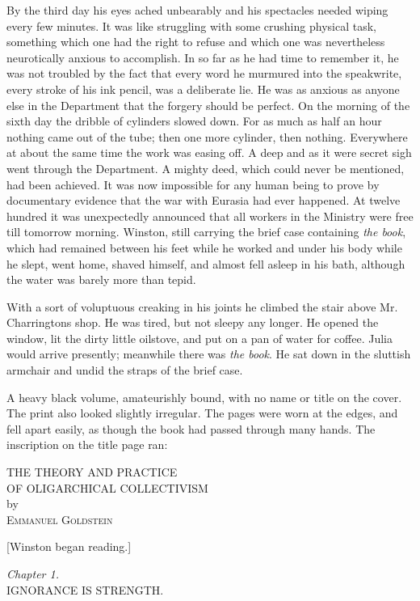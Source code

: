 By the third day his eyes ached unbearably and his spectacles needed
wiping every few minutes. It was like struggling with some crushing
physical task, something which one had the right to refuse and which one
was nevertheless neurotically anxious to accomplish. In so far as he had
time to remember it, he was not troubled by the fact that every word he
murmured into the speakwrite, every stroke of his ink pencil, was a
deliberate lie. He was as anxious as anyone else in the Department that
the forgery should be perfect. On the morning of the sixth day the
dribble of cylinders slowed down. For as much as half an hour nothing
came out of the tube; then one more cylinder, then nothing. Everywhere
at about the same time the work was easing off. A deep and as it were
secret sigh went through the Department. A mighty deed, which could
never be mentioned, had been achieved. It was now impossible for any
human being to prove by documentary evidence that the war with Eurasia
had ever happened. At twelve hundred it was unexpectedly announced that
all workers in the Ministry were free till tomorrow morning. Winston,
still carrying the brief case containing \emph{the book}, which had
remained between his feet while he worked and under his body while he
slept, went home, shaved himself, and almost fell asleep in his bath,
although the water was barely more than tepid.

With a sort of voluptuous creaking in his joints he climbed the stair
above Mr. Charrington\textquotesingle s shop. He was tired, but not
sleepy any longer. He opened the window, lit the dirty little oilstove,
and put on a pan of water for coffee. Julia would arrive presently;
meanwhile there was \emph{the book}. He sat down in the sluttish
armchair and undid the straps of the brief case.

A heavy black volume, amateurishly bound, with no name or title on the
cover. The print also looked slightly irregular. The pages were worn at
the edges, and fell apart easily, as though the book had passed through
many hands. The inscription on the title page ran:

\begin{center}
THE THEORY AND PRACTICE\\
OF OLIGARCHICAL COLLECTIVISM\\
by\\
\textsc{Emmanuel Goldstein}
\end{center}

[Winston began reading.]

\begin{center}
\emph{Chapter 1.}\\
IGNORANCE IS STRENGTH.
\end{center}

